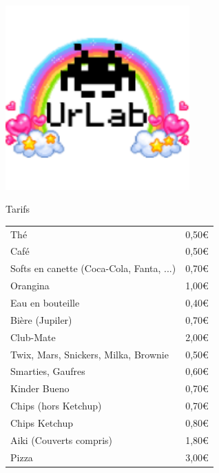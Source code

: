 \documentclass[a4paper,12pt]{article}
\begin{document}
\parindent0pt
\begin{center}
\includegraphics[width=200pt]{urlab.png}

 \Huge Tarifs
\end{center}

\LARGE
\begin{tabular}{ | l | l |}
  \hline
  Thé & 0,50\euro \\
  Café & 0,50\euro \\
  Softs en canette (Coca-Cola, Fanta, ...) & 0,70\euro \\
  Orangina & 1,00\euro \\
  Eau en bouteille & 0,40\euro \\
  Bière (Jupiler) & 0,70\euro \\
  Club-Mate & 2,00\euro \\
  \hline
  Twix, Mars, Snickers, Milka, Brownie & 0,50\euro \\
  Smarties, Gaufres & 0,60\euro \\
  Kinder Bueno & 0,70\euro \\
  Chips (hors Ketchup) & 0,70\euro \\
  Chips Ketchup & 0,80\euro \\
  \hline
  Aiki (Couverts compris) & 1,80\euro \\
  Pizza & 3,00\euro \\
  \hline

  \hline
\end{tabular}
\end{document}
